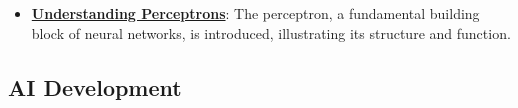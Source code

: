 \documentclass{article}%
\begin{document}
\begin{itemize}[leftmargin=*]
\item \href{\url{https://purdue.brightspace.com/d2l/common/assets/pdfjs-d2l-dist/1.0.14-legacy/web/viewer.html?file=\%252Fcontent\%252Fenforced\%252F1095467-wl.202510.CS.24300.001\%252F04L1-Linear\%20Algebra\%20Primer.pdf\%253Fou\%253D1095467\&lang=en-us\&container=d2l-fileviewer-rendered-pdf\&fullscreen=d2l-fileviewer-rendered-pdf-dialog\&height=667}#page=17}{\textbf{Understanding Perceptrons}}: The perceptron, a fundamental building block of neural networks, is introduced, illustrating its structure and function.%
\end{itemize}

%
\subsection{AI Development}%
\label{subsec:AIDevelopment}%
\end{document}
